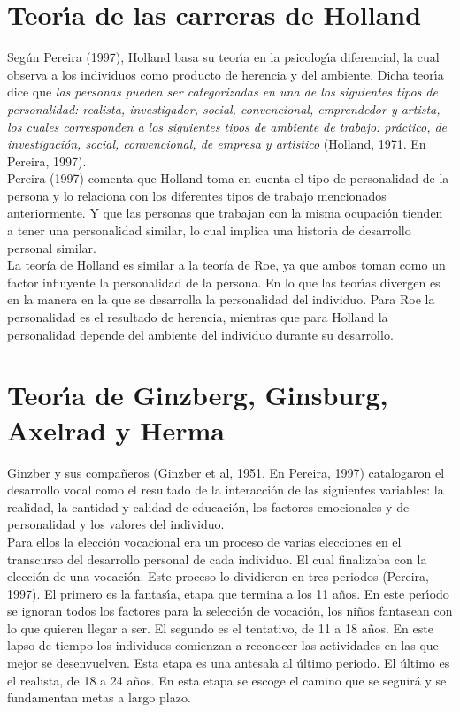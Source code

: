 \section{Teor\'{\i}a de las carreras de Holland}
Seg\'{u}n Pereira (1997), Holland basa su teor\'{\i}a en la psicolog\'{\i}a diferencial, la cual observa a los individuos como producto de herencia y del ambiente. Dicha teor\'{\i}a dice que \textit{las personas pueden ser categorizadas en una de los siguientes tipos de personalidad: realista, investigador, social, convencional, emprendedor y artista, los cuales corresponden a los siguientes tipos de ambiente de trabajo: pr\'{a}ctico, de investigaci\'{o}n, social, convencional, de empresa y art\'{\i}stico} (Holland, 1971. En Pereira, 1997).\\

Pereira (1997) comenta que Holland toma en cuenta el tipo de personalidad de la persona y lo relaciona con los diferentes tipos de trabajo mencionados anteriormente. Y que las personas que trabajan con la misma ocupaci\'{o}n tienden a tener una personalidad similar, lo cual implica una historia de desarrollo personal similar. \\

La teoría de Holland es similar a la teoría de Roe, ya que ambos toman como un factor influyente la personalidad de la persona. En lo que las teor\'{\i}as divergen es en la manera en la que se desarrolla la personalidad del individuo. Para Roe la personalidad es el resultado de herencia, mientras que para Holland la personalidad depende del ambiente del individuo durante su desarrollo.\\

\section{Teor\'{\i}a de Ginzberg, Ginsburg, Axelrad y Herma}
Ginzber y sus compa\~{n}eros (Ginzber et al, 1951. En Pereira, 1997) catalogaron el desarrollo vocal como el resultado de la interacci\'{o}n de las siguientes variables: la realidad, la cantidad y calidad de educaci\'{o}n, los factores emocionales y de personalidad y los valores del individuo. \\

Para ellos la elecci\'{o}n vocacional era un proceso de varias elecciones en el transcurso del desarrollo personal de cada individuo. El cual finalizaba con la elecci\'{o}n de una vocaci\'{o}n. Este proceso lo dividieron en tres periodos (Pereira, 1997). El primero es la fantas\'{\i}a, etapa que termina a los 11 a\~{n}os. En este per\'{\i}odo se ignoran todos los factores para la selecci\'{o}n de vocaci\'{o}n, los ni\~{n}os fantasean con lo que quieren llegar a ser. El segundo es el tentativo, de 11 a 18 a\~{n}os. En este lapso de tiempo los individuos comienzan a reconocer las actividades en las que mejor se desenvuelven. Esta etapa es una antesala al \'{u}ltimo periodo. El \'{u}ltimo es el realista, de 18 a 24 a\~{n}os. En esta etapa se escoge el camino que se seguir\'{a} y se fundamentan metas a largo plazo. \\

